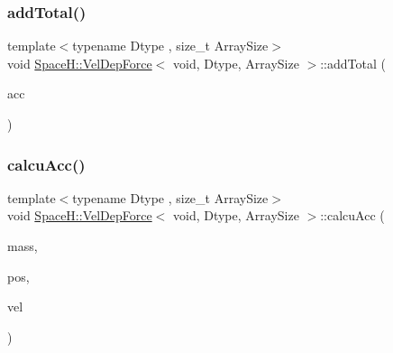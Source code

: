 \subsubsection{\texorpdfstring{add\+Total()}{addTotal()}}
{\footnotesize\ttfamily template$<$typename Dtype , size\+\_\+t Array\+Size$>$ \\
void \mbox{\hyperlink{struct_space_h_1_1_vel_dep_force}{Space\+H\+::\+Vel\+Dep\+Force}}$<$ void, Dtype, Array\+Size $>$\+::add\+Total (\begin{DoxyParamCaption}\item[{\mbox{\hyperlink{struct_space_h_1_1_vel_dep_force_3_01void_00_01_dtype_00_01_array_size_01_4_ab9ab08040353afbaeeade8a442331b8d}{Vector\+Array}} \&}]{acc }\end{DoxyParamCaption})\hspace{0.3cm}{\ttfamily [inline]}}

\mbox{\label{struct_space_h_1_1_vel_dep_force_3_01void_00_01_dtype_00_01_array_size_01_4_a4ee2b9965be834b8ff2056f5ffdc1272}} 
\subsubsection{\texorpdfstring{calcu\+Acc()}{calcuAcc()}\hspace{0.1cm}{\footnotesize\ttfamily [1/2]}}
{\footnotesize\ttfamily template$<$typename Dtype , size\+\_\+t Array\+Size$>$ \\
void \mbox{\hyperlink{struct_space_h_1_1_vel_dep_force}{Space\+H\+::\+Vel\+Dep\+Force}}$<$ void, Dtype, Array\+Size $>$\+::calcu\+Acc (\begin{DoxyParamCaption}\item[{const \mbox{\hyperlink{struct_space_h_1_1_vel_dep_force_3_01void_00_01_dtype_00_01_array_size_01_4_a3fdf665781fcc58227d1451b910aca63}{Scalar\+Array}} \&}]{mass,  }\item[{const \mbox{\hyperlink{struct_space_h_1_1_vel_dep_force_3_01void_00_01_dtype_00_01_array_size_01_4_ab9ab08040353afbaeeade8a442331b8d}{Vector\+Array}} \&}]{pos,  }\item[{const \mbox{\hyperlink{struct_space_h_1_1_vel_dep_force_3_01void_00_01_dtype_00_01_array_size_01_4_ab9ab08040353afbaeeade8a442331b8d}{Vector\+Array}} \&}]{vel }\end{DoxyParamCaption})\hspace{0.3cm}{\ttfamily [inline]}}

